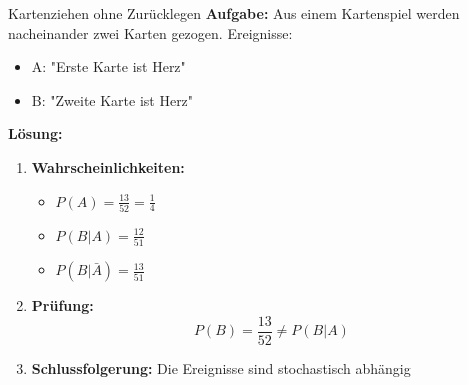 \begin{example2}{Kartenziehen ohne Zurücklegen}
\textbf{Aufgabe:} Aus einem Kartenspiel werden nacheinander zwei Karten gezogen.
Ereignisse:
\begin{itemize}
\item A: "Erste Karte ist Herz"
\item B: "Zweite Karte ist Herz"
\end{itemize}

\textbf{Lösung:}
\begin{enumerate}
\item \textbf{Wahrscheinlichkeiten:}
   \begin{itemize}
   \item $P(A) = \frac{13}{52} = \frac{1}{4}$
   \item $P(B|A) = \frac{12}{51}$
   \item $P(B|\bar{A}) = \frac{13}{51}$
   \end{itemize}

\item \textbf{Prüfung:}
   $$P(B) = \frac{13}{52} \neq P(B|A)$$

\item \textbf{Schlussfolgerung:} Die Ereignisse sind stochastisch abhängig
\end{enumerate}
\end{example2}


 
